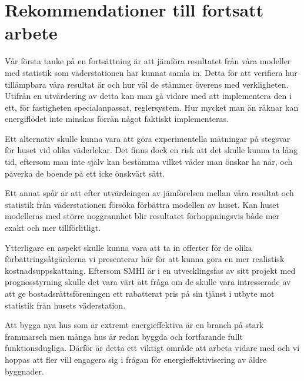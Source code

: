\section{Rekommendationer till fortsatt arbete}

Vår första tanke på en fortsättning är att jämföra resultatet från våra modeller med 
statistik som väderstationen har kunnat samla in. Detta för att verifiera hur tillämpbara 
våra resultat är och hur väl de stämmer överens med verkligheten. Utifrån en utvärdering
 av detta kan man gå vidare med att implementera den i ett, för fastigheten 
 specialanpassat, reglersystem. Hur mycket man än räknar kan energiflödet inte minskas 
 förrän något faktiskt implementeras.

Ett alternativ skulle kunna vara att göra experimentella mätningar på stegsvar för huset
 vid olika väderlekar. Det finns dock en risk att det skulle kunna ta lång tid, eftersom man 
 inte själv kan bestämma vilket väder man önskar ha när, och påverka de boende på ett 
 icke önskvärt sätt.

Ett annat spår är att efter utvärdeingen av jämförelsen mellan våra resultat och statistik 
från väderstationen försöka förbättra modellen av huset. Kan huset modelleras med 
större noggrannhet blir resultatet förhoppningsvis både mer exakt och mer tillförlitligt. %

Ytterligare en aspekt skulle kunna vara att ta in offerter för de olika förbättringsåtgärderna vi presenterar här för att kunna göra en mer realistisk kostnadsuppskattning. Eftersom 
SMHI är i en utvecklingsfas av sitt projekt med prognosstyrning skulle det vara värt att
 fråga om de skulle vara intresserade av att ge bostadsrättsföreningen ett rabatterat pris 
 på sin tjänst i utbyte mot statistik från husets väderstation.

Att bygga nya hus som är extremt energieffektiva är en branch på stark frammarsch men
 många hus är redan byggda och fortfarande fullt funktionsdugliga. Därför är detta ett 
viktigt område att arbeta vidare med och vi hoppas att fler vill engagera sig i frågan för 
energieffektivisering av äldre byggnader.